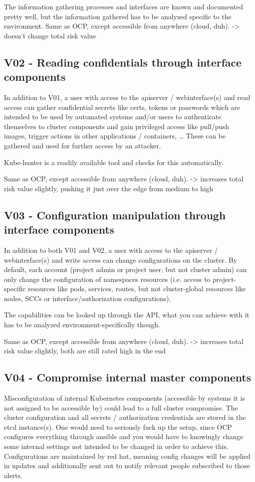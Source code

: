 The information gathering processes and interfaces are known and documented pretty well, but the information gathered has to be analyzed specific to the environment.
Same as OCP, except accessible from anywhere (cloud, duh).
-> doesn't change total risk value

\subsection{V02 - Reading confidentials through interface components}
In addition to V01, a user with access to the apiserver / webinterface(s) and read access can gather confidential secrets like certs, tokens or passwords which are intended to be used by automated systems and/or users to authenticate themselves to cluster components and gain privileged access like pull/push images, trigger actions in other applications / containers, …
These can be gathered and used for further access by an attacker.

Kube-hunter is a readily available tool and checks for this automatically.

Same as OCP, except accessible from anywhere (cloud, duh).
-> increases total risk value slightly, pushing it just over the edge from medium to high

\subsection{V03 - Configuration manipulation through interface components}
In addition to both V01 and V02, a user with access to the apiserver / webinterface(s) and write access can change configurations on the cluster. By default, each account (project admin or project user, but not cluster admin) can only change the configuration of namespaces resources (i.e. access to project-specific resources like pods, services, routes, but not cluster-global resources like nodes, SCCs or interface/authorization configurations). 

The capabilities can be looked up through the API, what you can achieve with it has to be analyzed environment-specifically though.

Same as OCP, except accessible from anywhere (cloud, duh).
-> increases total risk value slightly, both are still rated high in the end


\subsection{V04 - Compromise internal master components}
Misconfiguration of internal Kubernetes components (accessible by systems it is not assigned to be accessible by) could lead to a full cluster compromise. The cluster configuration and all secrets / authorization credentials are stored in the etcd instance(s). One would need to seriously fuck up the setup, since OCP configures everything through ansible and you would have to knowingly change some internal settings not intended to be changed in order to achieve this. Configurations are maintained by red hat, meaning config changes will be applied in updates and additionally sent out to notify relevant people subscribed to those alerts.

